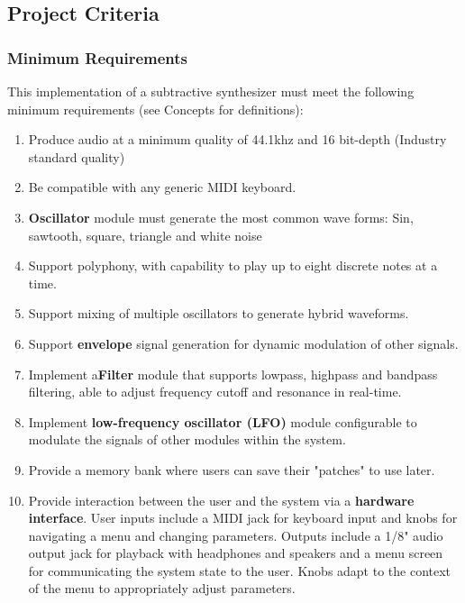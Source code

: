 \documentclass[acmlarge,screen]{acmart}
\begin{document}
\subsection{Project Criteria}
	\subsubsection{Minimum Requirements}
	\label{requirements}
	This implementation of a subtractive synthesizer must meet the following minimum requirements (see Concepts for definitions):
	\begin{enumerate}
		\item Produce audio at a minimum quality of 44.1khz and 16 bit-depth (Industry standard quality)
		\item Be compatible with any generic MIDI keyboard.
		\item \textbf{Oscillator} module must generate the most common wave forms: Sin, sawtooth, square, triangle and white noise
		\item Support polyphony, with capability to play up to eight discrete notes at a time.
		\item Support mixing of multiple oscillators to generate hybrid waveforms.
		\item Support \textbf{envelope} signal generation for dynamic modulation of other signals.
		\item Implement a\textbf{Filter} module that supports lowpass, highpass and bandpass filtering, able to adjust frequency cutoff and resonance in real-time.
		\item Implement \textbf{low-frequency oscillator (LFO)} module configurable to modulate the signals of other modules within the system.
		\item Provide a memory bank where users can save their "patches" to use later.
		\item Provide interaction between the user and the system via a \textbf{hardware interface}. User inputs include a MIDI jack for keyboard input and knobs for navigating a menu and changing parameters. Outputs include a 1/8" audio output jack for playback with headphones and speakers and a menu screen for communicating the system state to the user. Knobs adapt to the context of the menu to appropriately adjust parameters.
	\end{enumerate}
	
\end{document}
